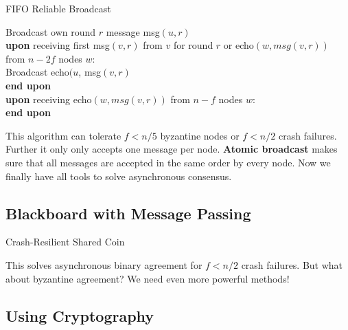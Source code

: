 \begin{algorithm}[H]
\caption{FIFO Reliable Broadcast}
	Broadcast own round $r$ message msg$(u, r)$ \\
	\textbf{upon} receiving first msg$(v, r)$ from $v$ for round $r$ or echo$(w, msg(v, r))$ from $n - 2f$ nodes $w$: \\
	Broadcast echo$(u$, msg$(v, r)$\\
	\textbf{end upon} \\
	
	\textbf{upon} receiving echo$(w, msg(v, r))$ from $n - f$ nodes $w$: \\
	\textbf{end upon}
\end{algorithm}
\medskip

This algorithm can tolerate $f < n/5$ byzantine nodes or $f < n/2$ crash failures. Further it only only accepts one message per node. \textbf{Atomic broadcast} makes sure that all messages are accepted in the same order by every node. Now we finally have all tools to solve asynchronous consensus.


\subsection{Blackboard with Message Passing}

\begin{algorithm}[H]
\caption{Crash-Resilient Shared Coin}
\end{algorithm}
\medskip

This solves asynchronous binary agreement for $f < n/2$ crash failures. But what about byzantine agreement? We need even more powerful methods!


\subsection{Using Cryptography}

